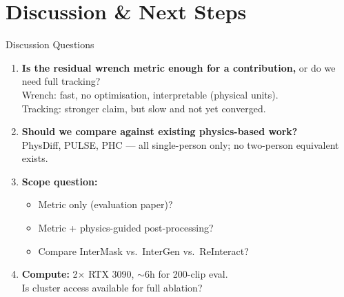 \documentclass[aspectratio=169, 10pt]{beamer}
\begin{document}
\section{Discussion \& Next Steps}

\begin{frame}{Discussion Questions}
  \small
  \begin{enumerate}\setlength\itemsep{0.5em}
    \item \textbf{Is the residual wrench metric enough for a contribution,} or do we need full tracking?\\
          Wrench: fast, no optimisation, interpretable (physical units).\\
          Tracking: stronger claim, but slow and not yet converged.

    \item \textbf{Should we compare against existing physics-based work?}\\
          PhysDiff, PULSE, PHC --- all single-person only; no two-person equivalent exists.

    \item \textbf{Scope question:}
          \begin{itemize}\setlength\itemsep{0pt}
            \item Metric only (evaluation paper)?
            \item Metric + physics-guided post-processing?
            \item Compare InterMask vs.\ InterGen vs.\ ReInteract?
          \end{itemize}

    \item \textbf{Compute:} 2$\times$ RTX 3090, $\sim$6h for 200-clip eval.\\
          Is cluster access available for full ablation?
  \end{enumerate}
\end{frame}

\end{document}
